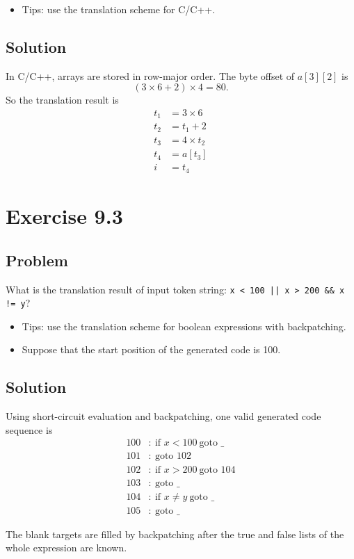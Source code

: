 \begin{itemize}
    \item Tips: use the translation scheme for C/C++.
\end{itemize}

\subsection{Solution}
In C/C++, arrays are stored in row-major order.
The byte offset of $a[3][2]$ is
\[
(3 \times 6 + 2) \times 4 = 80.
\]
So the translation result is
\begin{align*}
t_1 &= 3 \times 6 \\
t_2 &= t_1 + 2 \\
t_3 &= 4 \times t_2 \\
t_4 &= a[t_3] \\
i &= t_4
\end{align*}

\section{Exercise 9.3}
\subsection{Problem}
What is the translation result of input token string: \texttt{x < 100 || x > 200 \&\& x != y}?

\begin{itemize}
    \item Tips: use the translation scheme for boolean expressions with backpatching.
    \item Suppose that the start position of the generated code is 100.
\end{itemize}

\subsection{Solution}
Using short-circuit evaluation and backpatching, one valid generated code sequence is
\begin{align*}
100 &: \ \text{if } x < 100 \ \text{goto } \_ \\
101 &: \ \text{goto } 102 \\
102 &: \ \text{if } x > 200 \ \text{goto } 104 \\
103 &: \ \text{goto } \_ \\
104 &: \ \text{if } x \neq y \ \text{goto } \_ \\
105 &: \ \text{goto } \_
\end{align*}

The blank targets are filled by backpatching after the true and false lists of the whole expression are known.